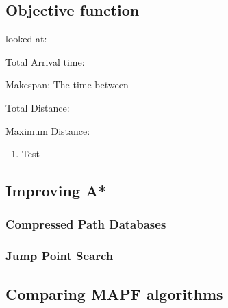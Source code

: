 \documentclass[a4paper,11pt]{article}
\begin{document}
\subsection{Objective function}

\cite{yu2015optimal} looked at: 
\begin{compactenum}
	\item Total Arrival time: 
	\item Makespan: The time between 
	\item Total Distance: 
	\item Maximum Distance: 
\end{compactenum}

\begin{enumerate}
	\item Test
\end{enumerate}



\subsubsection{}

\subsection{Improving A*}

\subsubsection{Compressed Path Databases}

\subsubsection{Jump Point Search}

\cite{renukamurthy2016improving}







\subsection{Comparing MAPF algorithms}
\end{document}
